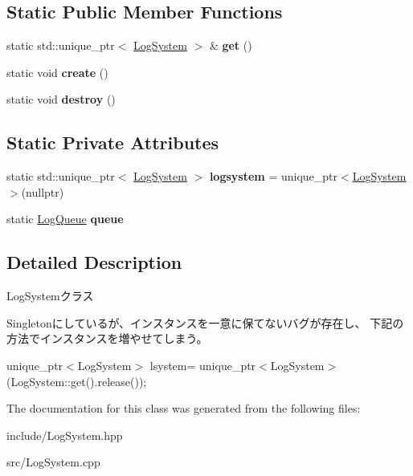 \subsection*{Static Public Member Functions}
\begin{DoxyCompactItemize}
\item 
\mbox{\label{class_g_a_1_1_log_system_ae6a49d4301f86ff287bc90320cbf5698}} 
static std\+::unique\+\_\+ptr$<$ \mbox{\hyperlink{class_g_a_1_1_log_system}{Log\+System}} $>$ \& {\bfseries get} ()
\item 
\mbox{\label{class_g_a_1_1_log_system_aba3eefd20f69e2ea25fe3229487a9c6d}} 
static void {\bfseries create} ()
\item 
\mbox{\label{class_g_a_1_1_log_system_a19cde21cbb3555b8bde82e57d475531f}} 
static void {\bfseries destroy} ()
\end{DoxyCompactItemize}
\subsection*{Static Private Attributes}
\begin{DoxyCompactItemize}
\item 
\mbox{\label{class_g_a_1_1_log_system_a66584752867fe618dbcc99dbde6ba572}} 
static std\+::unique\+\_\+ptr$<$ \mbox{\hyperlink{class_g_a_1_1_log_system}{Log\+System}} $>$ {\bfseries logsystem} = unique\+\_\+ptr$<$\mbox{\hyperlink{class_g_a_1_1_log_system}{Log\+System}}$>$(nullptr)
\item 
\mbox{\label{class_g_a_1_1_log_system_a77bec71a7878e7bff3e4cb77e185dc18}} 
static \mbox{\hyperlink{class_g_a_1_1_log_queue}{Log\+Queue}} {\bfseries queue}
\end{DoxyCompactItemize}


\subsection{Detailed Description}
Log\+Systemクラス 

Singletonにしているが、インスタンスを一意に保てないバグが存在し、 下記の方法でインスタンスを増やせてしまう。

unique\+\_\+ptr$<$\+Log\+System$>$ lsystem= unique\+\_\+ptr$<$\+Log\+System$>$(Log\+System\+::get().release()); 

The documentation for this class was generated from the following files\+:\begin{DoxyCompactItemize}
\item 
include/Log\+System.\+hpp\item 
src/Log\+System.\+cpp\end{DoxyCompactItemize}
